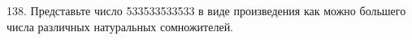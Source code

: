 138. Представьте число 533533533533 в виде произведения как можно большего числа различных натуральных сомножителей.\\
